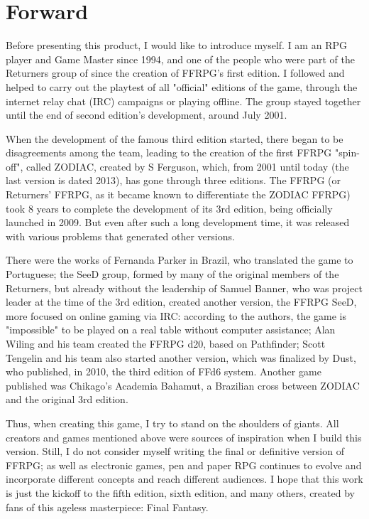 \setcounter{secnumdepth}{1}

\section*{Forward}
Before presenting this product, I would like
to introduce myself. I am an RPG player and Game
Master since 1994, and one of the people who
were part of the Returners group of since the
creation of FFRPG’s first edition. I followed and
helped to carry out the playtest of all "official"
editions of the game, through the internet relay
chat (IRC) campaigns or playing offline. The group
stayed together until the end of second edition’s
development, around July 2001.

When the development of the famous third
edition started, there began to be disagreements
among the team, leading to the creation of the first
FFRPG "spin-off", called ZODIAC, created by S
Ferguson, which, from 2001 until today (the last
version is dated 2013), has gone through three
editions. The FFRPG (or Returners' FFRPG, as it
became known to differentiate the ZODIAC FFRPG)
took 8 years to complete the development of its
3rd edition, being officially launched in 2009. But
even after such a long development time, it was
released with various problems that generated
other versions.

There were the works of Fernanda Parker in
Brazil, who translated the game to Portuguese; the
SeeD group, formed by many of the original
members of the Returners, but already without the
leadership of Samuel Banner, who was project
leader at the time of the 3rd edition, created
another version, the FFRPG SeeD, more focused on
online gaming via IRC: according to the authors,
the game is "impossible" to be played on a real
table without computer assistance; Alan Wiling 
and his team created the FFRPG d20, based on
Pathfinder; Scott Tengelin and his team also
started another version, which was finalized by
Dust, who published, in 2010, the third edition of
FFd6 system. Another game published was
Chikago’s Academia Bahamut, a Brazilian cross
between ZODIAC and the original 3rd edition.

Thus, when creating this game, I try to stand
on the shoulders of giants. All creators and games
mentioned above were sources of inspiration
when I build this version. Still, I do not consider
myself writing the final or definitive version of
FFRPG; as well as electronic games, pen and paper
RPG continues to evolve and incorporate different
concepts and reach different audiences. I hope that
this work is just the kickoff to the fifth edition,
sixth edition, and many others, created by fans of
this ageless masterpiece: Final Fantasy.

